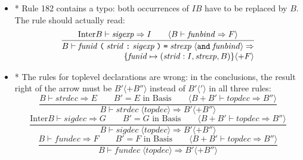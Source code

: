 \documentclass[twoside,titlepage]{article}
\begin{document}
\begin{appendix}
\begin{itemize}
\item * Rule 182 contains a typo: both occurrences of $\mathit{IB}$ have to be replaced by $B$. The rule should actually read:
%
\setcounter{equation}{181}
\begin{equation}
\frac{
\mbox{Inter} B \vdash \mathit{sigexp} \Rightarrow I
\qquad
\langle B \vdash \mathit{funbind} \Rightarrow F \rangle
}{
\begin{array}{@{}r@{}}
B \vdash \mathit{funid}\;\mbox{\tt(}\;\mathit{strid}\;\mbox{\tt:}\;\mathit{sigexp}\;\mbox{\tt)}
  \;\mbox{\tt=}\;\mathit{strexp}\; \langle {\tt and}\;\mathit{funbind} \rangle
  \Rightarrow \\
\{ \mathit{funid} \mapsto (\mathit{strid}:I, \mathit{strexp}, B) \}
  \langle + F \rangle
\end{array}
}
\end{equation}
%
\item * The rules for toplevel declarations are wrong: in the conclusions, the result right of the arrow must be $B' \langle+ B''\rangle$ instead of $B'\langle'\rangle$ in all three rules:
%
\setcounter{equation}{183}
\begin{equation}
\frac{
B \vdash \mathit{strdec} \Rightarrow E
\qquad
B' = \mbox{$E$ in Basis}
\qquad
\langle B+B' \vdash \mathit{topdec} \Rightarrow B'' \rangle
}{
B \vdash \mathit{strdec}\; \langle\mathit{topdec}\rangle
  \Rightarrow B' \langle+ B''\rangle
}
\end{equation}
%
\begin{equation}
\frac{
\mbox{Inter} B \vdash \mathit{sigdec} \Rightarrow G
\qquad
B' = \mbox{$G$ in Basis}
\qquad
\langle B+B' \vdash \mathit{topdec} \Rightarrow B'' \rangle
}{
B \vdash \mathit{sigdec}\; \langle\mathit{topdec}\rangle
  \Rightarrow B' \langle+ B''\rangle
}
\end{equation}
%
\begin{equation}
\frac{
B \vdash \mathit{fundec} \Rightarrow F
\qquad
B' = \mbox{$F$ in Basis}
\qquad
\langle B+B' \vdash \mathit{topdec} \Rightarrow B'' \rangle
}{
B \vdash \mathit{fundec}\; \langle\mathit{topdec}\rangle
  \Rightarrow B' \langle+ B''\rangle
}
\end{equation}
%
\end{itemize}



\end{appendix}
\end{document}
